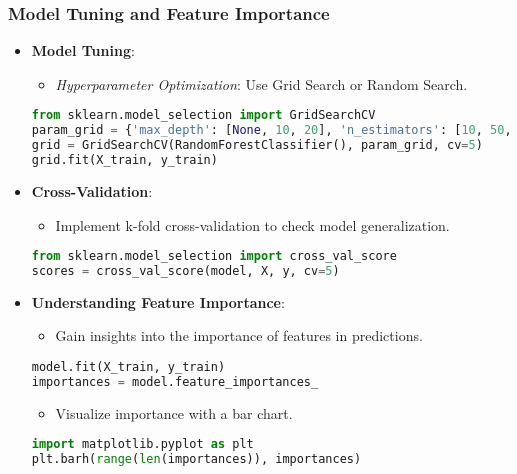 \documentclass[aspectratio=169]{beamer}
\begin{document}
\begin{frame}[fragile]
    \frametitle{Model Tuning and Feature Importance}
    \begin{itemize}
        \item \textbf{Model Tuning}:
        \begin{itemize}
            \item \textit{Hyperparameter Optimization}: Use Grid Search or Random Search.
            \end{itemize}
            \begin{lstlisting}[language=Python]
from sklearn.model_selection import GridSearchCV
param_grid = {'max_depth': [None, 10, 20], 'n_estimators': [10, 50, 100]}
grid = GridSearchCV(RandomForestClassifier(), param_grid, cv=5)
grid.fit(X_train, y_train)
            \end{lstlisting}
        
        \item \textbf{Cross-Validation}:
        \begin{itemize}
            \item Implement k-fold cross-validation to check model generalization.
            \end{itemize}
            \begin{lstlisting}[language=Python]
from sklearn.model_selection import cross_val_score
scores = cross_val_score(model, X, y, cv=5)
            \end{lstlisting}
        
        \item \textbf{Understanding Feature Importance}:
        \begin{itemize}
            \item Gain insights into the importance of features in predictions.
            \end{itemize}
            \begin{lstlisting}[language=Python]
model.fit(X_train, y_train)
importances = model.feature_importances_
            \end{lstlisting}
            \begin{itemize}
                \item Visualize importance with a bar chart.
                \end{itemize}
            \begin{lstlisting}[language=Python]
import matplotlib.pyplot as plt
plt.barh(range(len(importances)), importances)
            \end{lstlisting}
    \end{itemize}
\end{frame}
\end{document}
